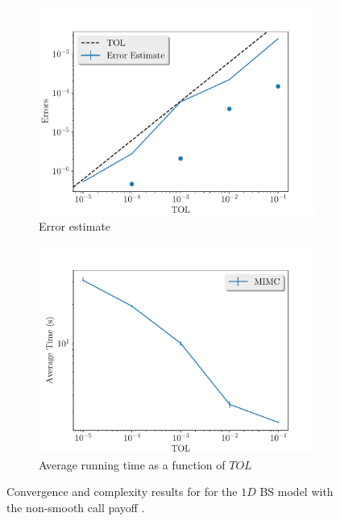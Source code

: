 \documentclass[11pt]{article}
\begin{document}
\begin{figure}[!h]
	\centering
	\begin{subfigure}{.5\textwidth}
		\centering
		\includegraphics[width=1\linewidth]{./figures/1D_BS_4_steps_non_smooth/error_estimate.pdf}
		\caption{Error estimate}
		\label{fig:misc_1D_BS_non_smooth_4steps_sub1}
	\end{subfigure}%
	\begin{subfigure}{.5\textwidth}
		\centering
		\includegraphics[width=1\linewidth]{./figures/1D_BS_4_steps_non_smooth/average_running_time.pdf}
		\caption{Average running time as a function of $TOL$}
		\label{fig:misc_1D_BS_non_smooth_4steps_sub2}
	\end{subfigure}%
	\caption{Convergence and complexity results for for the $1D$ BS model with the non-smooth call payoff .}
	\label{fig:misc_1D_BS_nonsmooth_4steps_2}
\end{figure}
\end{document}
